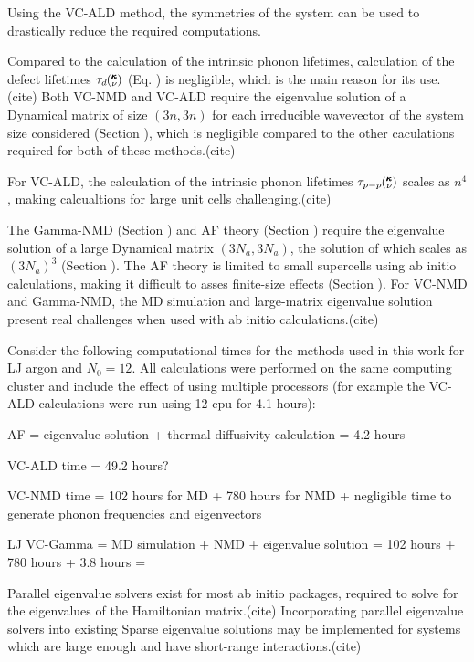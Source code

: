 \documentclass[aps,prb,twocolumn,superscriptaddress,amsmath,amssymb,floatfix]{revtex4}
\newcommand{\kv}{\mspace{-4.0mu}\left(\mspace{-8.0mu}
\begin{smallmatrix}&\pmb{\kappa} \\&\nu\end{smallmatrix}
\mspace{-3.0mu}\right)}
\begin{document}
Using the VC-ALD method, the symmetries of the system can be 
used to drastically reduce the required computations.
\cite{esfarjani_method_2008,turney_predicting_2009,
esfarjani_heat_2011,chaput_phonon-phonon_2011} 


Compared to 
the calculation of the intrinsic phonon lifetimes, calculation 
of the defect lifetimes $\tau_d\kv$ (Eq. ) is negligible, which is the main 
reason for its use.(cite)
Both VC-NMD and VC-ALD require the eigenvalue solution 
of a Dynamical matrix of size $(3n,3n)$ for each irreducible wavevector 
of the system size considered (Section ), 
which is negligible compared to the other 
caculations required for both of these methods.(cite) 


For VC-ALD, the calculation of the intrinsic phonon 
lifetimes $\tau_{p-p}\kv$ scales as $n^4$,\cite{turney_predicting_2009}  
making calcualtions for large unit cells challenging.(cite) 

The Gamma-NMD (Section ) and AF theory (Section ) 
require the eigenvalue solution of a large Dynamical matrix $(3N_a,3N_a)$, 
the solution of which scales as $(3N_a)^3$ (Section ). 
The AF theory is limited 
to small supercells using ab initio calculations, making it difficult 
to asses finite-size effects (Section ).  For VC-NMD and Gamma-NMD, the MD 
simulation and large-matrix eigenvalue solution present real challenges 
when used with ab initio calculations.(cite)

Consider the following computational times for the methods used in 
this work for LJ argon and $N_0 = 12$. All calculations were performed 
on the same computing cluster and include the effect of using 
multiple processors (for example the VC-ALD calculations were run using 
12 cpu for 4.1 hours):

AF = eigenvalue solution + thermal diffusivity calculation = 4.2 hours

VC-ALD time = 49.2 hours?

VC-NMD time = 102 hours for MD + 780 hours for NMD + negligible time 
to generate phonon frequencies and eigenvectors


LJ VC-Gamma = MD simulation + NMD + eigenvalue solution =  
102 hours + 780 hours + 3.8 hours = 


Parallel eigenvalue solvers exist for most ab initio packages, required 
to solve for the eigenvalues of the Hamiltonian matrix.(cite) Incorporating 
parallel eigenvalue solvers into existing 
Sparse eigenvalue solutions may be implemented for systems which are 
large enough and have short-range interactions.(cite)
\end{document}
